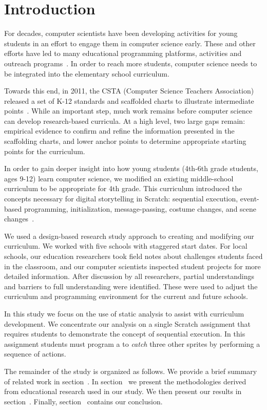 \section{Introduction}
For decades, computer scientists have been developing activities for young
students in an effort to engage them in computer science early. These and other
efforts have led to many educational programming platforms, activities and
outreach programs~\cite{wayanoutpost, georgiaoutreach,
Franklin:2011:ATA:1953163.1953295, Maloney:2010:SPL:1868358.1868363,
Dann:2000:MCP:343048.343070, Hood:2005:TPL:1067445.1067454, csunplugged}. In
order to reach more students, computer science needs to be integrated into the
elementary school curriculum.

Towards this end, in 2011, the CSTA (Computer Science Teachers Association)
released a set of K-12 standards and scaffolded charts to illustrate
intermediate points~\cite{cstastandards}. While an important step, much work
remains before computer science can develop research-based curricula. At a
high level, two large gaps remain: empirical evidence to confirm and refine the
information presented in the scaffolding charts, and lower anchor points to
determine appropriate starting points for the curriculum.

In order to gain deeper insight into how young students (4th-6th grade
students, ages 9-12) learn computer science, we modified an existing
middle-school curriculum to be appropriate for 4th grade. This curriculum
introduced the concepts necessary for digital storytelling in Scratch:
sequential execution, event-based programming, initialization, message-passing,
costume changes, and scene changes~\cite{Franklin:2013:SBO}.

We used a design-based research study approach to creating and modifying our
curriculum. We worked with five schools with staggered start dates. For local
schools, our education researchers took field notes about challenges students
faced in the classroom, and our computer scientists inspected student projects
for more detailed information. After discussion by all researchers, partial
understandings and barriers to full understanding were identified. These were
used to adjust the curriculum and programming environment for the current and
future schools.

In this study we focus on the use of static analysis to assist with curriculum
development. We concentrate our analysis on a single Scratch assignment that
requires students to demonstrate the concept of sequential execution. In this
assignment students must program a \net{} to \emph{catch} three other sprites
by performing a sequence of actions.

The remainder of the study is organized as follows. We provide a brief summary
of related work in section~. In
section~ we present the methodologies derived from
educational research used in our study. We then present our results in
section~. Finally, section~
contains our conclusion.
